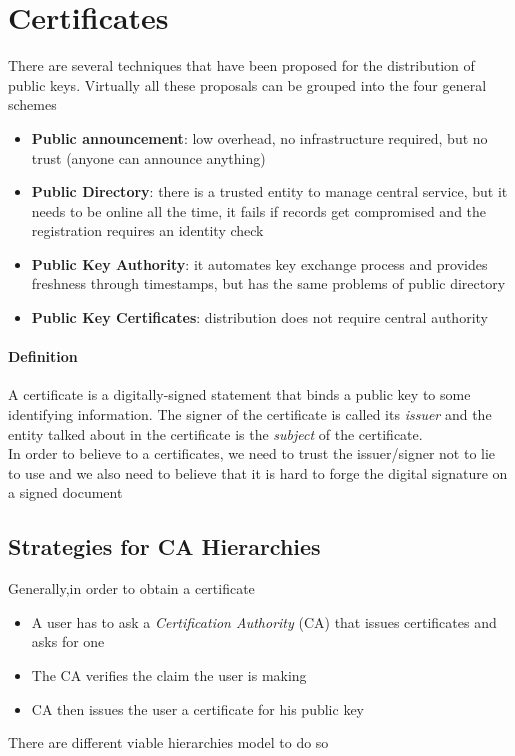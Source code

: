 \section{Certificates}
There are several techniques that have been proposed for the distribution of public keys. Virtually all these proposals can be grouped into the four general schemes
\begin{itemize}
    \item \textbf{Public announcement}: low overhead, no infrastructure required, but no trust (anyone can announce anything)
    \item \textbf{Public Directory}: there is a trusted entity to manage central service, but it needs to be online all the time, it fails if records get compromised and the registration requires an identity check
    \item \textbf{Public Key Authority}: it automates key exchange process and provides freshness through timestamps, but has the same problems of public directory
    \item \textbf{Public Key Certificates}: distribution does not require central authority
\end{itemize}

\paragraph{Definition} A certificate is a digitally-signed statement that binds a public key to some identifying information. The signer of the certificate is called its \textit{issuer} and the entity talked about in the certificate is the \textit{subject} of the certificate.\\

\noindent In order to believe to a certificates, we need to trust the issuer/signer not to lie to use and we also need to believe that it is hard to forge the digital signature on a signed document
\subsection{Strategies for CA Hierarchies}
Generally,in order to obtain a certificate
\begin{itemize}
    \item A user has to ask a \textit{Certification Authority} (CA) that issues certificates and asks for one
    \item The CA verifies the claim the user is making
    \item CA then issues the user a certificate for his public key
\end{itemize}
There are different viable hierarchies model to do so
